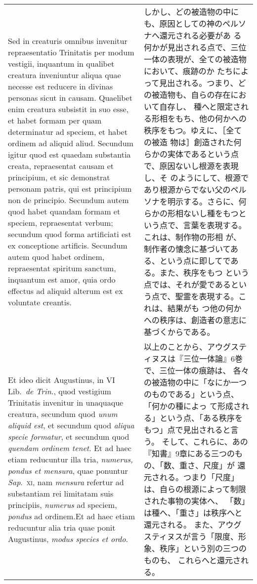 \documentclass[10pt]{jsarticle} %
\begin{document}
\begin{longtable}{p{21em}p{21em}}
Sed in creaturis omnibus invenitur repraesentatio Trinitatis
 per modum vestigii, inquantum in qualibet creatura inveniuntur aliqua
 quae necesse est reducere in divinas personas sicut in
 causam. Quaelibet enim creatura subsistit in suo esse, et habet formam
 per quam determinatur ad speciem, et habet ordinem ad aliquid
 aliud. Secundum igitur quod est quaedam substantia creata, repraesentat
 causam et principium, et sic demonstrat personam patris, qui est
 principium non de principio. Secundum autem quod habet quandam formam
 et speciem, repraesentat verbum; secundum quod forma artificiati est ex
 conceptione artificis. Secundum autem quod habet ordinem, repraesentat
 spiritum sanctum, inquantum est amor, quia ordo effectus ad aliquid
 alterum est ex voluntate creantis. 
&

しかし、どの被造物の中にも、原因としての神のペルソナへ還元される必要があ
 る何かが見出される点で、三位一体の表現が、全ての被造物において、痕跡のか
 たちによって見出される。つまり、どの被造物も、自らの存在において自存し、
 種へと限定される形相をもち、他の何かへの秩序をもつ。ゆえに、［全ての被造
 物は］創造された何らかの実体であるという点で、原因ないし根源を表現し、そ
 のようにして、根源であり根源からでない父のペルソナを明示する。さらに、何
 らかの形相ないし種をもつという点で、言葉を表現する。これは、制作物の形相
 が、制作者の懐念に基づいてある、という点に即してである。また、秩序をもつ
 という点では、それが愛であるという点で、聖霊を表現する。これは、結果がも
 つ他の何かへの秩序は、創造者の意志に基づくからである。

\\


Et ideo dicit Augustinus, in VI Lib.~{\itshape de Trin}., quod vestigium
 Trinitatis invenitur in unaquaque creatura, secundum quod {\itshape
 unum aliquid est}, et secundum quod {\itshape aliqua specie formatur},
 et secundum quod {\itshape quendam ordinem tenet}. Et ad haec etiam
 reducuntur illa tria, {\itshape numerus, pondus et mensura}, quae
 ponuntur {\itshape Sap}.~{\scshape xi}, nam {\itshape mensura} refertur
 ad substantiam rei limitatam suis principiis, {\itshape numerus} ad
 speciem, {\itshape pondus} ad ordinem.Et ad haec etiam
 reducuntur alia tria quae ponit Augustinus, {\itshape modus species et
 ordo}. 

&

以上のことから、アウグスティヌスは『三位一体論』6巻で、三位一体の痕跡は、
 各々の被造物の中に「なにか一つのものである」という点、「何かの種によっ
 て形成される」という点、「ある秩序をもつ」点で見出されると言う。
そして、これらに、あの『知書』9章にある三つのもの、「数、重さ、尺度」が
 還元される。つまり「尺度」は、自らの根源によって制限された事物の実体へ、
 「数」は種へ、「重さ」は秩序へと還元される。
また、アウグスティヌスが言う「限度、形象、秩序」という別の三つのものも、
 これらへと還元される。


\end{longtable}
\end{document}
